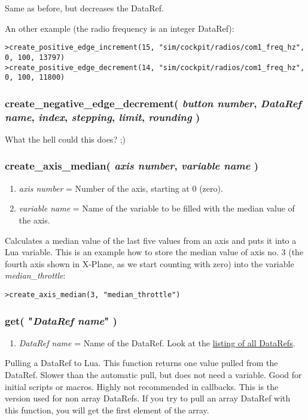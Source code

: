\documentclass[11pt,parskip=half,a4paper]{scrartcl}
\begin{document}
Same as before, but decreases the DataRef.

An other example (the radio frequency is an integer DataRef):

\verb|>create_positive_edge_increment(15, "sim/cockpit/radios/com1_freq_hz", 0, 100, 13797)|\\
\verb|>create_positive_edge_decrement(14, "sim/cockpit/radios/com1_freq_hz", 0, 100, 11800)|

\subsubsection{create\_negative\_edge\_decrement( \emph{button number}, \emph{DataRef name}, \emph{index}, \emph{stepping}, \emph{limit}, \emph{rounding} )}

What the hell could this does? ;)

\subsubsection{create\_axis\_median( \emph{axis number}, \emph{variable name} )}

\begin{enumerate}
	\item \emph{axis number} = Number of the axis, starting at 0 (zero).
	\item \emph{variable name} = Name of the variable to be filled with the median value of the axis.
\end{enumerate}

Calculates a median value of the last five values from an axis and puts it into a Lua variable. This is an example how to store the median value of axis no. 3 (the fourth axis shown in X-Plane, as we start counting with zero) into the variable \emph{median\_throttle}:

\verb|>create_axis_median(3, "median_throttle")|

\subsubsection{get( "\emph{DataRef name}" )}

\begin{enumerate}
	\item \emph{DataRef name} = Name of the DataRef. Look at the \href{http://www.xsquawkbox.net/xpsdk/docs/DataRefs.html}{listing of all DataRefs}.
\end{enumerate}

Pulling a DataRef to Lua. This function returns one value pulled from the DataRef. Slower than the automatic pull, but does not need a variable. Good for initial scripts or macros. Highly not recommended in callbacks. This is the version used for non array DataRefs. If you try to pull an array DataRef with this function, you will get the first element of the array.
\end{document}
